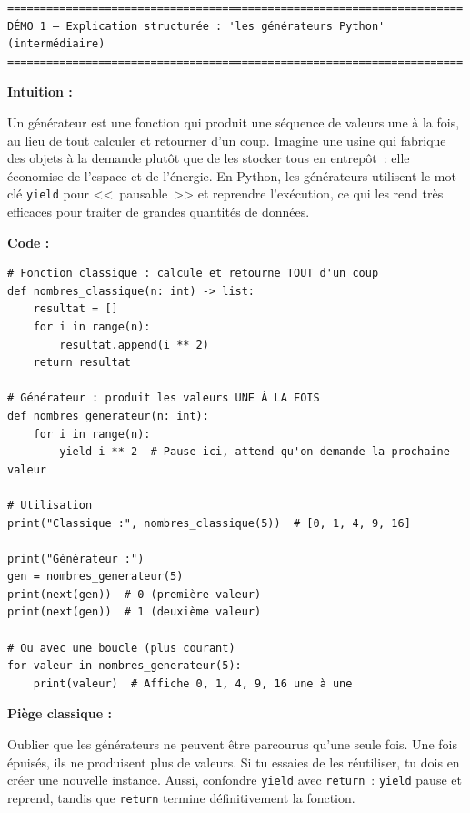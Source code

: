 \documentclass[11pt,a4paper]{article}
\begin{document}
\begin{tcolorbox}[
  colback=white,
  colframe=black!50,
  coltitle=black,
  fonttitle=\footnotesize\bfseries,
  fontupper=\footnotesize,
  title=Sortie de l'exécution,
  breakable,
]
\begin{verbatim}
======================================================================
DÉMO 1 — Explication structurée : 'les générateurs Python' (intermédiaire)
======================================================================
\end{verbatim}

\textbf{Intuition :}

Un générateur est une fonction qui produit une séquence de valeurs une à la
fois, au lieu de tout calculer et retourner d'un coup. Imagine une usine qui
fabrique des objets à la demande plutôt que de les stocker tous en entrepôt~:
elle économise de l'espace et de l'énergie. En Python, les générateurs
utilisent le mot-clé \texttt{yield} pour <<~pausable~>> et reprendre
l'exécution, ce qui les rend très efficaces pour traiter de grandes quantités
de données.

\textbf{Code :}

\begin{verbatim}
# Fonction classique : calcule et retourne TOUT d'un coup
def nombres_classique(n: int) -> list:
    resultat = []
    for i in range(n):
        resultat.append(i ** 2)
    return resultat

# Générateur : produit les valeurs UNE À LA FOIS
def nombres_generateur(n: int):
    for i in range(n):
        yield i ** 2  # Pause ici, attend qu'on demande la prochaine valeur

# Utilisation
print("Classique :", nombres_classique(5))  # [0, 1, 4, 9, 16]

print("Générateur :")
gen = nombres_generateur(5)
print(next(gen))  # 0 (première valeur)
print(next(gen))  # 1 (deuxième valeur)

# Ou avec une boucle (plus courant)
for valeur in nombres_generateur(5):
    print(valeur)  # Affiche 0, 1, 4, 9, 16 une à une
\end{verbatim}

\textbf{Piège classique :}

Oublier que les générateurs ne peuvent être parcourus qu'une seule fois. Une
fois épuisés, ils ne produisent plus de valeurs. Si tu essaies de les
réutiliser, tu dois en créer une nouvelle instance. Aussi, confondre
\texttt{yield} avec \texttt{return}~: \texttt{yield} pause et reprend, tandis
que \texttt{return} termine définitivement la fonction.


\end{tcolorbox}
\end{document}
